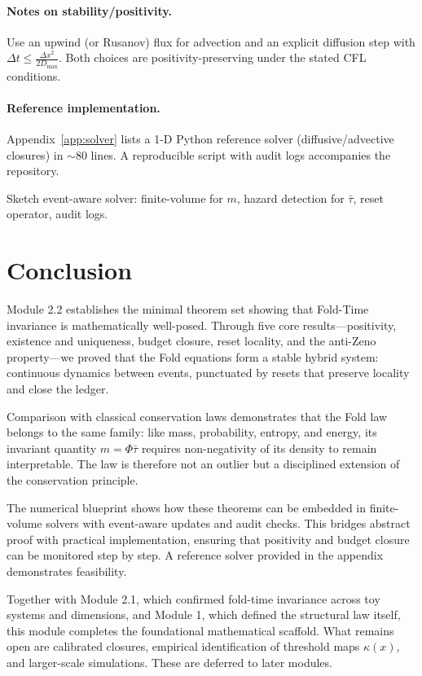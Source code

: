\documentclass[11pt]{article}
\begin{document}
\paragraph{Notes on stability/positivity.}
Use an upwind (or Rusanov) flux for advection and an explicit diffusion step with $\Delta t \le \frac{\Delta x^2}{2D_{\max}}$.
Both choices are positivity-preserving under the stated CFL conditions.

\paragraph{Reference implementation.}
Appendix~\ref{app:solver}  lists a 1-D Python reference solver (diffusive/advective closures) in $\sim$80 lines.
A reproducible script with audit logs accompanies the repository.

Sketch event-aware solver: finite-volume for $m$, hazard detection for $\bar{\tau}$,
reset operator, audit logs.

\section{Conclusion}

Module 2.2 establishes the minimal theorem set showing that Fold-Time 
invariance is mathematically well-posed. Through five core results---positivity, 
existence and uniqueness, budget closure, reset locality, and the anti-Zeno 
property---we proved that the Fold equations form a stable hybrid system: 
continuous dynamics between events, punctuated by resets that preserve 
locality and close the ledger.

Comparison with classical conservation laws demonstrates that the Fold 
law belongs to the same family: like mass, probability, entropy, and energy, 
its invariant quantity $m = \Phi \bar{\tau}$ requires non-negativity of its density 
to remain interpretable. The law is therefore not an outlier but a disciplined 
extension of the conservation principle.

The numerical blueprint shows how these theorems can be embedded in 
finite-volume solvers with event-aware updates and audit checks. This bridges 
abstract proof with practical implementation, ensuring that positivity and 
budget closure can be monitored step by step. A reference solver provided in 
the appendix demonstrates feasibility.

Together with Module 2.1, which confirmed fold-time invariance across 
toy systems and dimensions, and Module 1, which defined the structural 
law itself, this module completes the foundational mathematical scaffold. 
What remains open are calibrated closures, empirical identification of 
threshold maps $\kappa(x)$, and larger-scale simulations. These are deferred 
to later modules.
\end{document}
